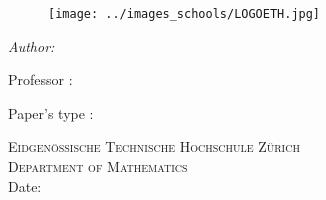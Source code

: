 \begin{titlepage}

\begin{figure}[!htb]
   \begin{minipage}{0.48\textwidth}
	  \texttt{[image: ../images\_schools/LOGOETH.jpg]} \\[1cm]
   \end{minipage}\hfill
\end{figure}

\begin{flushleft} \large
\vspace*{2 cm}
{\huge \bfseries \reporttitle} 
\vspace*{1.5 cm}

\textit{Author:} \reportauthor
\vspace*{1.5 cm}

{ Professor : \professor }

{Paper's type : \course}
\end{flushleft}

\vspace*{5 cm}
\begin{center}
\textsc{\Large Eidgenössische Technische Hochschule Zürich}\\[0.5cm] 
\textsc{\large Department of Mathematics}\\[0.5cm] 
\makeatletter
Date: \@date 
\makeatother



\end{center}

\vfill %






\end{titlepage}
